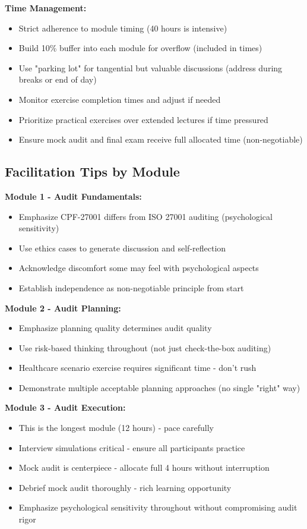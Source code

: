 \documentclass[11pt,a4paper]{article}
\begin{document}
\textbf{Time Management:}
\begin{itemize}
\item Strict adherence to module timing (40 hours is intensive)
\item Build 10\% buffer into each module for overflow (included in times)
\item Use "parking lot" for tangential but valuable discussions (address during breaks or end of day)
\item Monitor exercise completion times and adjust if needed
\item Prioritize practical exercises over extended lectures if time pressured
\item Ensure mock audit and final exam receive full allocated time (non-negotiable)
\end{itemize}

\subsection{Facilitation Tips by Module}

\textbf{Module 1 - Audit Fundamentals:}
\begin{itemize}
\item Emphasize CPF-27001 differs from ISO 27001 auditing (psychological sensitivity)
\item Use ethics cases to generate discussion and self-reflection
\item Acknowledge discomfort some may feel with psychological aspects
\item Establish independence as non-negotiable principle from start
\end{itemize}

\textbf{Module 2 - Audit Planning:}
\begin{itemize}
\item Emphasize planning quality determines audit quality
\item Use risk-based thinking throughout (not just check-the-box auditing)
\item Healthcare scenario exercise requires significant time - don't rush
\item Demonstrate multiple acceptable planning approaches (no single "right" way)
\end{itemize}

\textbf{Module 3 - Audit Execution:}
\begin{itemize}
\item This is the longest module (12 hours) - pace carefully
\item Interview simulations critical - ensure all participants practice
\item Mock audit is centerpiece - allocate full 4 hours without interruption
\item Debrief mock audit thoroughly - rich learning opportunity
\item Emphasize psychological sensitivity throughout without compromising audit rigor
\end{itemize}
\end{document}
